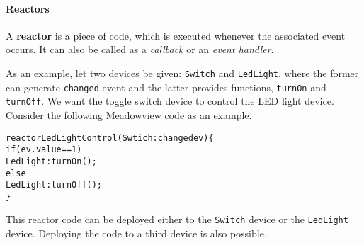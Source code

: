 \documentclass{note}
\begin{document}
\paragraph{Reactors}
A \textcolor{blue2}{\bf{}reactor} is a piece of code,
which is executed whenever the associated event occurs. 
It can also be called as a \textcolor{blue2}{\em callback\/} or an
\textcolor{blue2}{\em event handler\/}.  

As an example, let two devices be given: \textcolor{red2}{\texttt{Switch}} and 
\textcolor{red2}{\texttt{LedLight}}, where the former can generate
\textcolor{red2}{\texttt{changed}} event 
and the latter provides functions, 
\textcolor{red2}{\texttt{turnOn}} and 
\textcolor{red2}{\texttt{turnOff}}.
We want the toggle switch device to control the LED light device.
Consider the following Meadowview code as an example.
\begin{alltt}
  \textcolor{red2}{reactor LedLightControl(Swtich:changed ev) \{
    if (ev.value == 1)
      LedLight:turnOn();
    else
      LedLight:turnOff();
  \}}
\end{alltt}
This reactor code can be deployed either to the
\textcolor{red2}{\texttt{Switch}} device 
or the \textcolor{red2}{\texttt{LedLight}} device. Deploying the code to a
third device is also possible.
\end{document}
